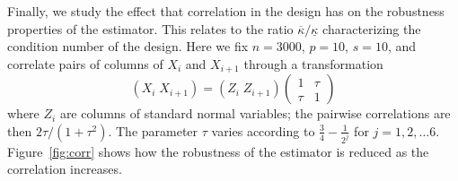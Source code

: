 Finally, we study the effect that correlation in the design has on the robustness properties
of the estimator. This relates to 
the ratio $\overline{\kappa}/\underline{\kappa}$ characterizing the condition number of the design.
Here we fix $n=3000$, $p=10$, $s=10$, and correlate pairs of columns of $X_{i}$ and $X_{i+1}$
through a transformation 
\begin{equation*}
  (X_{i} \; X_{i+1}) = (Z_{i} \; Z_{i+1}) \begin{pmatrix}1 & \tau \\ \tau & 1\end{pmatrix}
\end{equation*}
where $Z_i$ are columns of standard normal variables; the pairwise correlations are then $2\tau/(1+\tau^2)$.
The parameter $\tau$ varies according to $\frac{3}{4} - \frac{1}{2^j}$ 
for $j=1,2,\ldots 6$. Figure~\ref{fig:corr} shows how the robustness of the estimator is reduced as the correlation increases.

